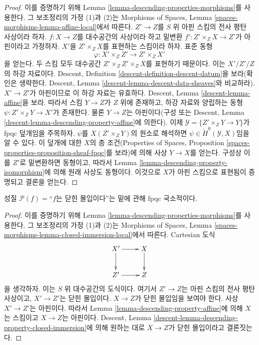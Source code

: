 \begin{proof}
이를 증명하기 위해 Lemma \ref{lemma-descending-properties-morphisms}를
사용한다. 그 보조정리의 가정 (1)과 (2)는 Morphisms of Spaces, Lemma
\ref{spaces-morphisms-lemma-affine-local}에서 따른다. $Z'\to Z$를 $S$ 위
아핀 스킴의 전사 평탄 사상이라 하자. $f:X\to Z$를 대수공간의 사상이라
하고 밑변환 $f':Z'\times_ZX\to Z'$가 아핀이라고 가정하자.
$X'$을 $Z'\times_ZX$를 표현하는 스킴이라 하자. 표준 동형
$$
\varphi : X' \times_Z Z' \longrightarrow Z' \times_Z X'
$$
을 얻는다. 두 스킴 모두 대수공간 $Z'\times_ZZ'\times_ZX$를 표현하기
때문이다. 이는 $X'/Z'/Z$의 하강 자료이다. Descent, Definition
\ref{descent-definition-descent-datum}을 보라(확인은 생략한다. Descent,
Lemma \ref{descent-lemma-descent-data-sheaves}와 비교하라). $X'\to Z'$가
아핀이므로 이 하강 자료는 유효하다. Descent, Lemma
\ref{descent-lemma-affine}을 보라. 따라서 스킴 $Y\to Z$가 $Z$ 위에 존재하고, 하강
자료와 양립하는 동형 $\psi:Z'\times_ZY\to X'$가 존재한다. 물론
$Y\to Z$는 아핀이다(구성 또는 Descent, Lemma
\ref{descent-lemma-descending-property-affine}에 의한다). 이제
$\mathcal{Y}=\{Z'\times_ZY\to Y\}$가 fpqc 덮개임을 주목하자.
$\psi$를 $X(Z'\times_ZY)$의 원소로 해석하면
$\psi\in\check{H}^0(\mathcal{Y},X)$임을 알 수 있다. 이 덮개에 대한
$X$의 층 조건(Properties of Spaces, Proposition
\ref{spaces-properties-proposition-sheaf-fpqc}를 보라)에 의해 사상
$Y\to X$를 얻는다. 구성상 이를 $Z'$로 밑변환하면 동형이고, 따라서
Lemma \ref{lemma-descending-property-isomorphism}에 의해 원래 사상도
동형이다. 이것으로 $X$가 아핀 스킴으로 표현됨이 증명되고 결론을 얻는다.
\end{proof}

\begin{lemma}
\label{lemma-descending-property-closed-immersion}
성질 $\mathcal{P}(f)=$``$f$는 닫힌 몰입이다''는 밑에 관해 fpqc
국소적이다.
\end{lemma}

\begin{proof}
이를 증명하기 위해 Lemma \ref{lemma-descending-properties-morphisms}를
사용한다. 그 보조정리의 가정 (1)과 (2)는 Morphisms of Spaces, Lemma
\ref{spaces-morphisms-lemma-closed-immersion-local}에서 따른다. Cartesian 도식
$$
\xymatrix{
X' \ar[r] \ar[d] & X \ar[d] \\
Z' \ar[r] & Z
}
$$
을 생각하자. 이는 $S$ 위 대수공간의 도식이다. 여기서 $Z'\to Z$는
아핀 스킴의 전사 평탄 사상이고,
$X'\to Z'$는 닫힌 몰입이다. $X\to Z$가 닫힌 몰입임을 보여야 한다.
사상 $X'\to Z'$는 아핀이다. 따라서 Lemma
\ref{lemma-descending-property-affine}에 의해 $X$는 스킴이고
$X\to Z$는 아핀이다. Descent, Lemma
\ref{descent-lemma-descending-property-closed-immersion}에 의해 원하는
대로 $X\to Z$가 닫힌 몰입이라고 결론짓는다.
\end{proof}

